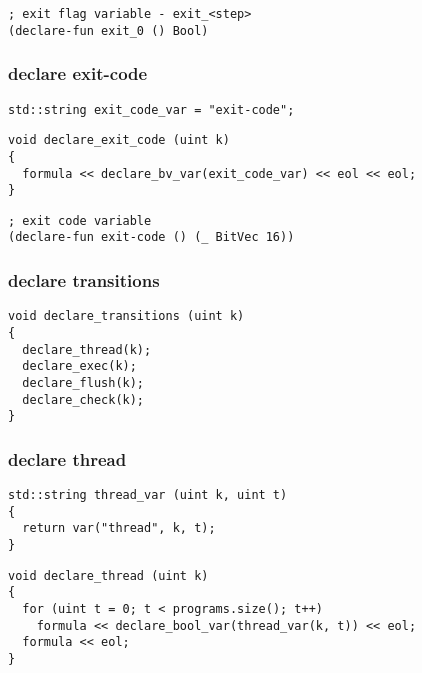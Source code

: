 \begin{lstlisting}[language=SMTLib]
; exit flag variable - exit_<step>
(declare-fun exit_0 () Bool)
\end{lstlisting}

\subsubsection{declare exit-code}

\begin{lstlisting}[style=c++]
std::string exit_code_var = "exit-code";
\end{lstlisting}

\begin{lstlisting}[style=c++]
void declare_exit_code (uint k)
{
  formula << declare_bv_var(exit_code_var) << eol << eol;
}
\end{lstlisting}

\begin{lstlisting}[language=SMTLib]
; exit code variable
(declare-fun exit-code () (_ BitVec 16))
\end{lstlisting}

\subsubsection{declare transitions}

\begin{lstlisting}[style=c++]
void declare_transitions (uint k)
{
  declare_thread(k);
  declare_exec(k);
  declare_flush(k);
  declare_check(k);
}
\end{lstlisting}

\subsubsection{declare thread}

\begin{lstlisting}[style=c++]
std::string thread_var (uint k, uint t)
{
  return var("thread", k, t);
}
\end{lstlisting}

\begin{lstlisting}[style=c++]
void declare_thread (uint k)
{
  for (uint t = 0; t < programs.size(); t++)
    formula << declare_bool_var(thread_var(k, t)) << eol;
  formula << eol;
}
\end{lstlisting}

